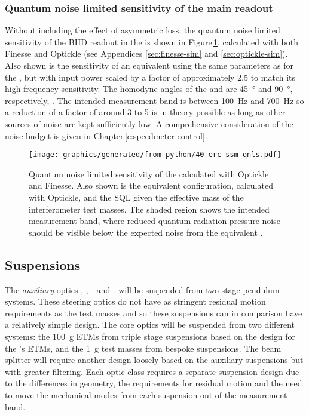 \subsubsection{Quantum noise limited sensitivity of the main readout}
Without including the effect of asymmetric loss, the quantum noise limited sensitivity of the \gls{BHD} readout in the \SSMEXPT{} is shown in Figure\,\ref{fig:erc-ssm-qnls}, calculated with both Finesse and Optickle (see Appendices \ref{sec:finesse-sim} and \ref{sec:optickle-sim}). Also shown is the sensitivity of an equivalent \MI{} using the same parameters as for the \SSM{}, but with input power scaled by a factor of approximately \num{2.5} to match its high frequency sensitivity. The homodyne angles of the \SSM{} and \MI{} are \SI{45}{\degree} and \SI{90}{\degree}, respectively, . The intended measurement band is between \SI{100}{\hertz} and \SI{700}{\hertz} so a reduction of a factor of around \num{3} to \num{5} is in theory possible as long as other sources of noise are kept sufficiently low. A comprehensive consideration of the noise budget is given in Chapter\,\ref{c:speedmeter-control}.

\begin{figure}
  \centering
  \texttt{[image: graphics/generated/from-python/40-erc-ssm-qnls.pdf]}
  \caption[Quantum noise limited sensitivity of the \SSMEXPT{}]{\label{fig:erc-ssm-qnls}Quantum noise limited sensitivity of the \SSMEXPT{} calculated with Optickle and Finesse. Also shown is the equivalent \MI{} configuration, calculated with Optickle, and the \gls{SQL} given the effective mass of the interferometer test masses. The shaded  region shows the intended measurement band, where reduced quantum radiation pressure noise should be visible below the expected noise from the equivalent \MI{}.}
\end{figure}

\subsection{Suspensions}
The \emph{auxiliary} optics \MFOUR{}, \MFIVE{}, \MSEVEN{}-\MTEN{} and \MTWELVE{}-\MFIFTEEN{} will be suspended from two stage pendulum systems. These steering optics do not have as stringent residual motion requirements as the test masses and so these suspensions can in comparison have a relatively simple design. The core optics will be suspended from two different systems: the \SI{100}{\gram} \glspl{ETM} from triple stage suspensions based on the design for the \AEIPROTOTYPE{}'s \glspl{ETM}, and the \SI{1}{\gram} test masses from bespoke  suspensions. The beam splitter \MSIX{} will require another design loosely based on the auxiliary suspensions but with greater filtering. Each optic class requires a separate suspension design due to the differences in geometry, the requirements for residual motion and the need to move the mechanical modes from each suspension out of the measurement band.

